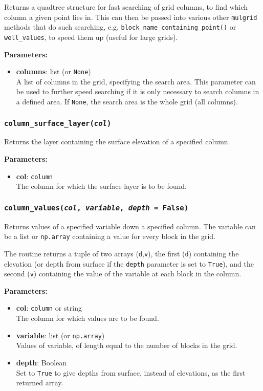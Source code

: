 Returns a quadtree structure for fast searching of grid columns, to find which column a given point lies in.  This can then be passed into various other \texttt{mulgrid} methods that do such searching, e.g. \texttt{block\_name\_containing\_point()} or \texttt{well\_values}, to speed them up (useful for large grids).

\textbf{Parameters:}
\begin{itemize}
\item \textbf{columns}: list (or \texttt{None})\\
  A list of columns in the grid, specifying the search area.  This parameter can be used to further speed searching if it is only necessary to search columns in a defined area.  If \texttt{None}, the search area is the whole grid (all columns).
\end{itemize}

\subsubsection{\texttt{column\_surface\_layer(\emph{col})}}

Returns the layer containing the surface elevation of a specified column.

\textbf{Parameters:}
\begin{itemize}
\item \textbf{col}: \texttt{column}\\
  The column for which the surface layer is to be found.
\end{itemize}

\subsubsection{\texttt{column\_values(\emph{col}, \emph{variable}, \emph{depth} = False)}}

Returns values of a specified variable down a specified column.  The variable can be a list or \texttt{np.array} containing a value for every block in the grid.

The routine returns a tuple of two arrays (\texttt{d},\texttt{v}), the first (\texttt{d}) containing the elevation (or depth from surface if the \texttt{depth} parameter is set to \texttt{True}), and the second (\texttt{v}) containing the value of the variable at each block in the column.

\textbf{Parameters:}
\begin{itemize}
\item \textbf{col}: \texttt{column} or string\\
  The column for which values are to be found.
\item \textbf{variable}: list (or \texttt{np.array})\\
  Values of variable, of length equal to the number of blocks in the grid.
\item \textbf{depth}: Boolean\\
  Set to \texttt{True} to give depths from surface, instead of elevations, as the first returned array.
\end{itemize}

